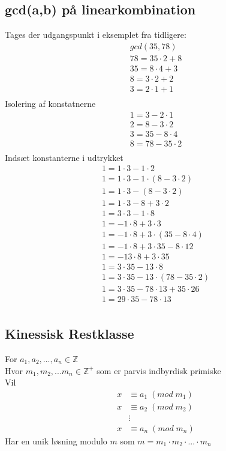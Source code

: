 \documentclass[12pt, a4paper]{article}
\begin{document}
		\subsection{gcd(a,b) på linearkombination} 
			Tages der udgangspunkt i eksemplet fra tidligere:
			\begin{align*}
				gcd(35,78)\\
				78=35\cdot 2 +8\\
				35=8\cdot 4+3\\
				8=3\cdot 2 + 2\\
				3=2\cdot 1 +1\\
			\end{align*}
			Isolering af konstatnerne
			\begin{align*}
				1=3-2\cdot 1\\
				2=8-3\cdot 2\\
				3=35-8\cdot 4\\
				8=78-35\cdot 2\\
			\end{align*}
			Indsæt konstanterne i udtrykket
			\begin{align*}
				1=1\cdot 3-1\cdot 2\\
				1=1\cdot 3 - 1\cdot (8-3\cdot 2)\\
				1=1\cdot 3 -(8-3\cdot 2)\\
				1=1\cdot 3 -8+3\cdot 2\\
				1=3\cdot 3 -1\cdot 8\\
				1=-1\cdot 8 + 3\cdot 3\\
				1=-1\cdot 8 + 3\cdot (35-8\cdot 4)\\
				1=-1\cdot 8 + 3\cdot 35 - 8\cdot 12\\
				1=-13\cdot 8 + 3\cdot 35\\
				1=3\cdot 35 - 13\cdot 8\\
				1=3\cdot 35 - 13\cdot (78-35\cdot 2)\\
				1=3\cdot 35 - 78\cdot 13 + 35\cdot 26\\
				1=29\cdot 35 - 78\cdot 13\\
			\end{align*}
		\subsection{Kinessisk Restklasse}
			For $a_1,a_2,...,a_n \in \mathbb{Z}$\\
			Hvor $m_1,m_2,...m_n \in \mathbb{Z}^+$ som er parvis indbyrdisk primiske\\
			Vil \begin{align*}
				x&\equiv a_1 \;(mod\;m_1)\\
				x&\equiv a_2\; (mod\;m_2)\\
				 &\vdots\\
				x&\equiv a_n \;(mod\;m_n)
			\end{align*}
			Har en unik løsning modulo $m$ som $m=m_1\cdot m_2\cdot ...\cdot m_n$
\end{document}
